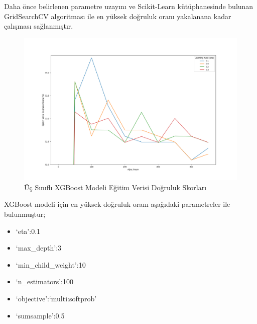 \documentclass[12pt,twoside]{deuthesis}
\providecommand{\tightlist}{%
  \setlength{\itemsep}{0pt}\setlength{\parskip}{0pt}}
\begin{document}
Daha önce belirlenen parametre uzayını ve Scikit-Learn kütüphanesinde bulunan GridSearchCV algoritması ile en yüksek doğruluk oranı yakalanana kadar çalışması sağlanmıştır.
\begin{figure}

{\centering \includegraphics[width=1.1\linewidth,height=0.5\textheight]{figure/XGB_Grid_Graph} 

}

\caption{Üç Sınıflı XGBoost Modeli Eğitim Verisi Doğruluk Skorları}\label{fig:unnamed-chunk-37}
\end{figure}
XGBoost modeli için en yüksek doğruluk oranı aşağıdaki parametreler ile bulunmuştur;
\begin{itemize}
\tightlist
\item
  `eta':0.1
\item
  `max\_depth':3
\item
  `min\_child\_weight':10
\item
  `n\_estimators':100
\item
  `objective':`multi:softprob'
\item
  `sumsample':0.5
\end{itemize}
\newpage
\end{document}

